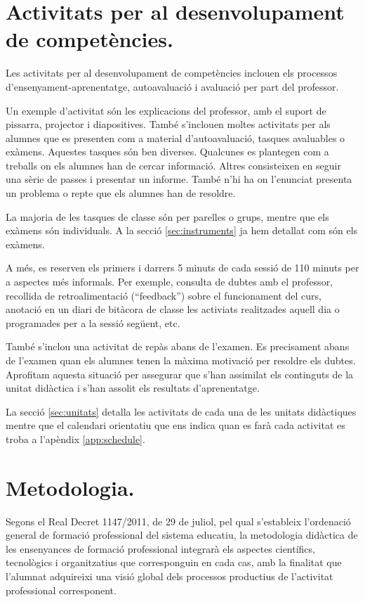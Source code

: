 \documentclass[catalan, a4paper, 12pt, titlepage]{article}
\begin{document}
\section{Activitats per al desenvolupament de competències.}
\label{sec:activitats}

Les activitats per al desenvolupament de competències inclouen els processos d'ensenyament-aprenentatge, autoavaluació i avaluació per part del professor.

Un exemple d'activitat són les explicacions del professor, amb el suport de pissarra, projector i diapositives.
També s'inclouen moltes activitats  per als alumnes que es presenten com a material d'autoavaluació, tasques avaluables o exàmens.
Aquestes tasques són ben diverses.
Qualcunes es plantegen com a treballs on els alumnes han de cercar informació.
Altres consisteixen en seguir una sèrie de passes i presentar un informe.
També n'hi ha on l'enunciat presenta un problema o repte que els alumnes han de resoldre.

La majoria de les tasques de classe són per parelles o grups, mentre que els exàmens són individuals.
A la secció \ref{sec:instruments} ja hem detallat com són els exàmens.

A més, es reserven els primers i darrers 5 minuts de cada sessió de 110 minuts per a aspectes més informals.
Per exemple, consulta de dubtes amb el professor, recollida de retroalimentació (``feedback'') sobre el funcionament del curs, anotació en un diari de bitàcora de classe les activiats realitzades aquell dia o programades per a la sessió següent, etc.

També s'inclou una activitat de repàs abans de l'examen.
Es precisament abans de l'examen quan els alumnes tenen la màxima motivació per resoldre els dubtes.
Aprofitam aquesta situació per assegurar que s'han assimilat els continguts de la unitat didàctica i s'han assolit els resultats d'aprenentatge.

La secció \ref{sec:unitats} detalla les activitats de cada una de les unitats didàctiques mentre que el calendari orientatiu que ens indica quan es farà cada activitat es troba a l'apèndix \ref{app:schedule}.

\section{Metodologia.}
\label{sec:metodologia}

Segons el Real Decret 1147/2011, de 29 de juliol, pel qual s'estableix l'ordenació general de formació professional del sistema educatiu, la metodologia didàctica de les ensenyances de formació professional integrarà els aspectes científics, tecnològics i organitzatius que corresponguin en cada cas, amb la finalitat que l'alumnat adquireixi una visió global dels processos productius de l'activitat professional corresponent.
\end{document}
